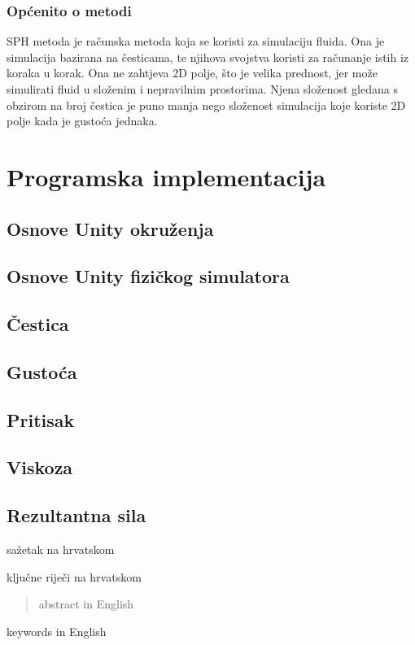 \documentclass[diplomskirad]{fer}
\begin{document}
    \subsection{Općenito o metodi}\label{subsec:opcenito-o-metodi}

    SPH metoda je računska metoda koja se koristi za simulaciju fluida.
    Ona je simulacija bazirana na česticama, te njihova svojstva koristi za računanje istih iz koraka u korak.
    Ona ne zahtjeva 2D polje, što je velika prednost, jer može simulirati fluid u složenim i nepravilnim prostorima.
    Njena složenost gledana s obzirom na broj čestica je puno manja nego složenost simulacija koje koriste 2D polje kada je gustoća jednaka.


    \chapter{Programska implementacija}\label{ch:programska-implementacija}

    \section{Osnove Unity okruženja}\label{sec:osnove-unity-okruzenja}
    \section{Osnove Unity fizičkog simulatora}\label{sec:osnove-unity-fizickog-simulatora}
    \section{Čestica}\label{sec:cestica}
    \section{Gustoća}\label{sec:gustoca}
    \section{Pritisak}\label{sec:pritisak}
    \section{Viskoza}\label{sec:viskoza}
    \section{Rezultantna sila}\label{sec:rezultantna-sila}


    
    \begin{sazetak}
        sažetak na hrvatskom
    \end{sazetak}
    \begin{kljucnerijeci}
        ključne riječi na hrvatskom
    \end{kljucnerijeci}
    \begin{abstract}
        abstract in English
    \end{abstract}
    \begin{keywords}
        keywords in English
    \end{keywords}
\end{document}

